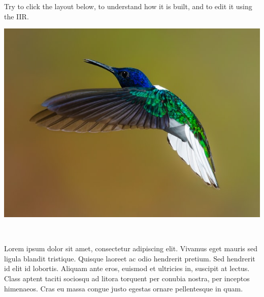 \documentclass[11pt, a4paper]{article}
\begin{document}
\begin{example}
    Try to click the layout below, to understand how it is built, and to edit it using the IIR.

    \begin{gridlayout}{\textwidth}{11cm}
        \begin{row}{0.65}
            \begin{cell}{0.646}
                \includegraphics[width=\cellwidth]{img/bird.jpg}
            \end{cell}
            \begin{cell}{0.054}
                ~
            \end{cell}
            \begin{cell}{0.3}
                Lorem ipsum dolor sit amet, consectetur adipiscing elit. Vivamus eget mauris sed ligula blandit tristique. Quisque laoreet ac odio hendrerit pretium. Sed hendrerit id elit id lobortis. Aliquam ante eros, euismod et ultricies in, suscipit at lectus. Class aptent taciti sociosqu ad litora torquent per conubia nostra, per inceptos himenaeos. Cras eu massa congue justo egestas ornare pellentesque in quam.
            \end{cell}
        \end{row}
        \begin{row}{0.05}
            \begin{cell}{1}
                ~ 
            \end{cell}
        \end{row}
        \begin{row}{0.3}
            \begin{cell}{0.3}

\end{cell}
\end{row}
\end{gridlayout}
\end{example}
\end{document}
